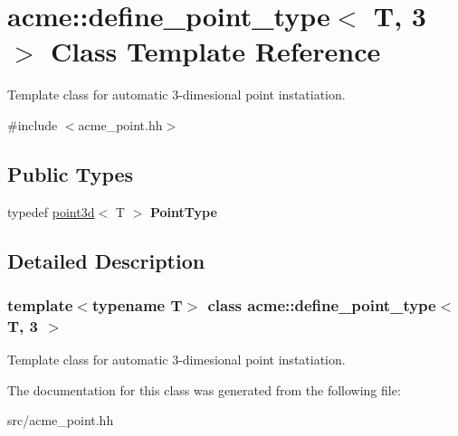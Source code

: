 \hypertarget{classacme_1_1define__point__type_3_01_t_00_013_01_4}{}\section{acme\+:\+:define\+\_\+point\+\_\+type$<$ T, 3 $>$ Class Template Reference}
\label{classacme_1_1define__point__type_3_01_t_00_013_01_4}


Template class for automatic 3-\/dimesional point instatiation.  




{\ttfamily \#include $<$acme\+\_\+point.\+hh$>$}

\subsection*{Public Types}
\begin{DoxyCompactItemize}
\item 
\mbox{\label{classacme_1_1define__point__type_3_01_t_00_013_01_4_a99fdb1835a73c3f28b58f64e6cbb4d89}} 
typedef \hyperlink{classacme_1_1point3d}{point3d}$<$ T $>$ {\bfseries Point\+Type}
\end{DoxyCompactItemize}


\subsection{Detailed Description}
\subsubsection*{template$<$typename T$>$\newline
class acme\+::define\+\_\+point\+\_\+type$<$ T, 3 $>$}

Template class for automatic 3-\/dimesional point instatiation. 

The documentation for this class was generated from the following file\+:\begin{DoxyCompactItemize}
\item 
src/acme\+\_\+point.\+hh\end{DoxyCompactItemize}
